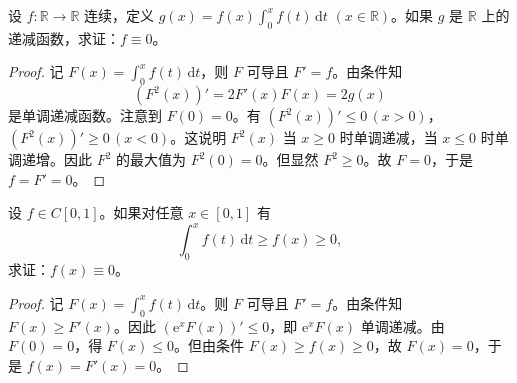 \documentclass[../../main.tex]{subfiles}
\begin{document}
\begin{example}
设 \( f : \mathbb{R} \to \mathbb{R} \) 连续，定义 \( g(x) = f(x)\int_{0}^{x} f(t) \, \mathrm{d}t \) \((x \in \mathbb{R})\)。如果 \( g \) 是 \( \mathbb{R} \) 上的递减函数，求证：\( f \equiv 0 \)。
\end{example}
\begin{proof}
记 \( F(x) = \int_{0}^{x} f(t) \, \mathrm{d}t \)，则 \( F \) 可导且 \( F' = f \)。由条件知
\[
(F^2(x))' = 2F'(x)F(x) = 2g(x)
\]
是单调递减函数。注意到 \( F(0) = 0 \)。有 \( (F^2(x))' \leqslant 0 \, (x > 0) \)，\( (F^2(x))' \geqslant 0 \, (x < 0) \)。这说明 \( F^2(x) \) 当 \( x \geqslant 0 \) 时单调递减，当 \( x \leqslant 0 \) 时单调递增。因此 \( F^2 \) 的最大值为 \( F^2(0) = 0 \)。但显然 \( F^2 \geqslant 0 \)。故 \( F = 0 \)，于是 \( f =F'= 0 \)。

\end{proof}

\begin{example}
设 \( f \in C[0,1] \)。如果对任意 \( x \in [0,1] \) 有
\[
\int_{0}^{x} f(t) \, \mathrm{d}t \geqslant f(x) \geqslant 0,
\]
求证：\( f(x) \equiv 0 \)。
\end{example}
\begin{proof}
记 \( F(x) = \int_{0}^{x} f(t) \, \mathrm{d}t \)。则 \( F \) 可导且 \( F' = f \)。由条件知 \( F(x) \geqslant F'(x) \)。因此 \( (\mathrm{e}^x F(x))' \leqslant 0 \)，即 \( \mathrm{e}^x F(x) \) 单调递减。由 \( F(0) = 0 \)，得 \( F(x) \leqslant 0 \)。但由条件 \( F(x) \geqslant f(x) \geqslant 0 \)，故 \( F(x) = 0 \)，于是 \( f(x) =F'(x)= 0 \)。

\end{proof}
\end{document}
